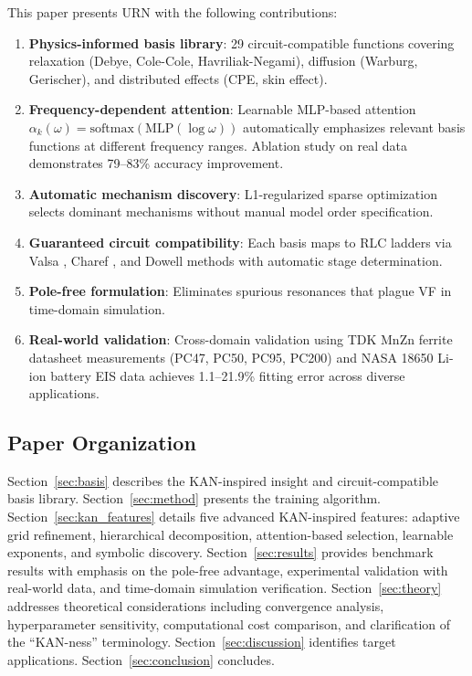 \documentclass{ieeeaccess}
\begin{document}
This paper presents URN with the following contributions:

\begin{enumerate}
\item \textbf{Physics-informed basis library}: 29 circuit-compatible functions covering relaxation (Debye, Cole-Cole, Havriliak-Negami), diffusion (Warburg, Gerischer), and distributed effects (CPE, skin effect).

\item \textbf{Frequency-dependent attention}: Learnable MLP-based attention $\alpha_k(\omega) = \text{softmax}(\text{MLP}(\log\omega))$ automatically emphasizes relevant basis functions at different frequency ranges. Ablation study on real data demonstrates 79--83\% accuracy improvement.

\item \textbf{Automatic mechanism discovery}: L1-regularized sparse optimization selects dominant mechanisms without manual model order specification.

\item \textbf{Guaranteed circuit compatibility}: Each basis maps to RLC ladders via Valsa \cite{valsa2013rc}, Charef \cite{charef1992fractal}, and Dowell \cite{dowell1966eddy} methods with automatic stage determination.

\item \textbf{Pole-free formulation}: Eliminates spurious resonances that plague VF in time-domain simulation.

\item \textbf{Real-world validation}: Cross-domain validation using TDK MnZn ferrite datasheet measurements (PC47, PC50, PC95, PC200) and NASA 18650 Li-ion battery EIS data achieves 1.1--21.9\% fitting error across diverse applications.
\end{enumerate}

\subsection{Paper Organization}

Section~\ref{sec:basis} describes the KAN-inspired insight and circuit-compatible basis library. Section~\ref{sec:method} presents the training algorithm. Section~\ref{sec:kan_features} details five advanced KAN-inspired features: adaptive grid refinement, hierarchical decomposition, attention-based selection, learnable exponents, and symbolic discovery. Section~\ref{sec:results} provides benchmark results with emphasis on the pole-free advantage, experimental validation with real-world data, and time-domain simulation verification. Section~\ref{sec:theory} addresses theoretical considerations including convergence analysis, hyperparameter sensitivity, computational cost comparison, and clarification of the ``KAN-ness'' terminology. Section~\ref{sec:discussion} identifies target applications. Section~\ref{sec:conclusion} concludes.
\end{document}
